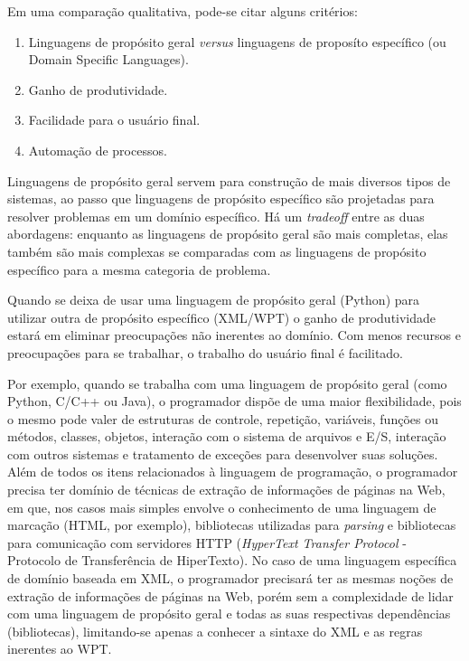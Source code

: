 Em uma comparação qualitativa, pode-se citar alguns critérios:

\begin{enumerate}
	\item Linguagens de propósito geral \emph{versus} linguagens de proposíto específico (ou Domain Specific Languages).
	\item Ganho de produtividade.
	\item Facilidade para o usuário final.
	\item Automação de processos.
\end{enumerate}

Linguagens de propósito geral servem para construção de mais diversos tipos de sistemas, ao passo que linguagens de propósito específico são projetadas para resolver problemas em um domínio específico. Há um \emph{tradeoff} entre as duas abordagens: enquanto as linguagens de propósito geral são mais completas, elas também são mais complexas se comparadas com as linguagens de propósito específico para a mesma categoria de problema.

Quando se deixa de usar uma linguagem de propósito geral (Python) para utilizar outra de propósito específico (XML/WPT) o ganho de produtividade estará em eliminar preocupações não inerentes ao domínio. Com menos recursos e preocupações para se trabalhar, o trabalho do usuário final é facilitado.

Por exemplo, quando se trabalha com uma linguagem de propósito geral (como Python, C/C++ ou Java), o programador dispõe de uma maior flexibilidade, pois o mesmo pode valer de estruturas de controle, repetição, variáveis, funções ou métodos, classes, objetos, interação com o sistema de arquivos e E/S, interação com outros sistemas e tratamento de exceções para desenvolver suas soluções. Além de todos os itens relacionados à linguagem de programação, o programador precisa ter domínio de técnicas de extração de informações de páginas na Web, em que, nos casos mais simples envolve o conhecimento de uma linguagem de marcação (HTML, por exemplo), bibliotecas utilizadas para \emph{parsing} e bibliotecas para comunicação com servidores HTTP (\emph{HyperText Transfer Protocol} - Protocolo de Transferência de HiperTexto). No caso de uma linguagem específica de domínio baseada em XML, o programador precisará ter as mesmas noções de extração de informações de páginas na Web, porém sem a complexidade de lidar com uma linguagem de propósito geral e todas as suas respectivas dependências (bibliotecas), limitando-se apenas a conhecer a sintaxe do XML e as regras inerentes ao WPT.


